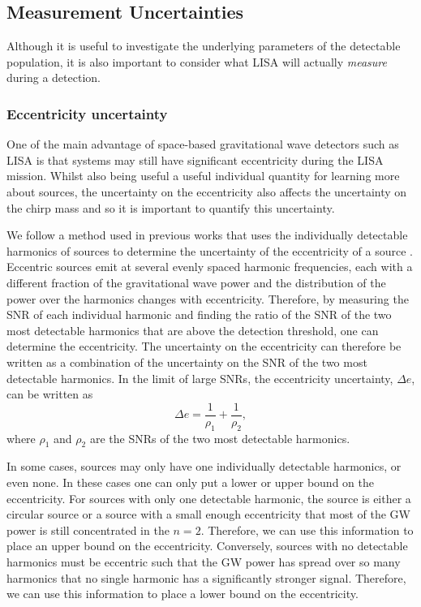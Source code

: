 \subsection{Measurement Uncertainties}\label{sec:measurement_uncertainties}
Although it is useful to investigate the underlying parameters of the detectable population, it is also important to consider what LISA will actually \textit{measure} during a detection.

\subsubsection{Eccentricity uncertainty}\label{sec:ecc_unc}
One of the main advantage of space-based gravitational wave detectors such as LISA is that systems may still have significant eccentricity during the LISA mission. Whilst also being useful a useful individual quantity for learning more about sources, the uncertainty on the eccentricity also affects the uncertainty on the chirp mass and so it is important to quantify this uncertainty.

We follow a method used in previous works that uses the individually detectable harmonics of sources to determine the uncertainty of the eccentricity of a source \citep[e.g.][]{Lau+2020, Korol+2021}. Eccentric sources emit at several evenly spaced harmonic frequencies, each with a different fraction of the gravitational wave power and the distribution of the power over the harmonics changes with eccentricity. Therefore, by measuring the SNR of each individual harmonic and finding the ratio of the SNR of the two most detectable harmonics that are above the detection threshold, one can determine the eccentricity. The uncertainty on the eccentricity can therefore be written as a combination of the uncertainty on the SNR of the two most detectable harmonics. In the limit of large SNRs, the eccentricity uncertainty, $\Delta e$, can be written as 
\begin{equation}
    \Delta e = \frac{1}{\rho_1} + \frac{1}{\rho_2},
\end{equation}
where $\rho_1$ and $\rho_2$ are the SNRs of the two most detectable harmonics.

In some cases, sources may only have one individually detectable harmonics, or even none. In these cases one can only put a lower or upper bound on the eccentricity. For sources with only one detectable harmonic, the source is either a circular source or a source with a small enough eccentricity that most of the GW power is still concentrated in the $n = 2$. Therefore, we can use this information to place an upper bound on the eccentricity. Conversely, sources with no detectable harmonics must be eccentric such that the GW power has spread over so many harmonics that no single harmonic has a significantly stronger signal. Therefore, we can use this information to place a lower bound on the eccentricity.

